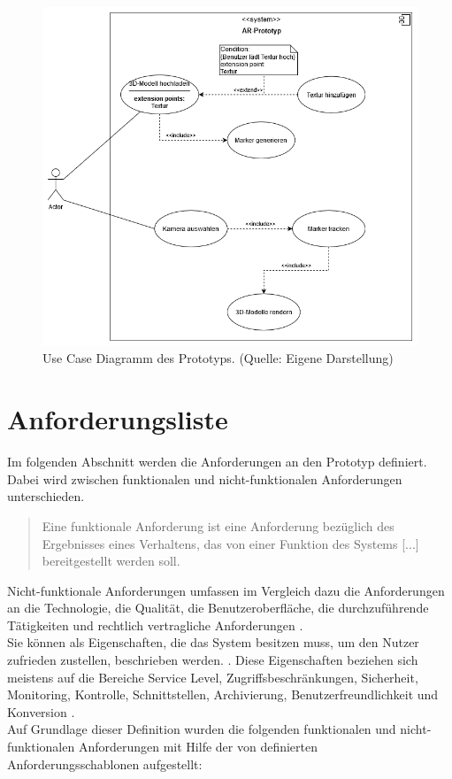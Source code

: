 \begin{figure}[h!]
\centering
\includegraphics[width=1.0\textwidth]{Abbildungen/use-case-diagram.png}
\caption[Use Cases des Prototyps]{Use Case Diagramm des Prototyps. (Quelle: Eigene Darstellung)}
\label{fig:Use-Cases}
\end{figure}


\section{Anforderungsliste}
Im folgenden Abschnitt werden die Anforderungen an den Prototyp definiert. Dabei wird zwischen funktionalen und nicht-funktionalen Anforderungen unterschieden. 
\begin{quote}
\glqq Eine funktionale Anforderung ist eine Anforderung bezüglich des Ergebnisses eines Verhaltens, das von einer Funktion des Systems [...] bereitgestellt werden soll.\grqq \citep[S. 17]{rupp:requirements}
\end{quote}
Nicht-funktionale Anforderungen umfassen im Vergleich dazu die Anforderungen an die Technologie, die Qualität, die Benutzeroberfläche, die durchzuführende Tätigkeiten und rechtlich vertragliche Anforderungen \citep[S. 17]{rupp:requirements}.\\
Sie können als Eigenschaften, die das System besitzen muss, um den Nutzer zufrieden zustellen, beschrieben werden. \citep[S. 10]{robertson:requirements-process}. Diese Eigenschaften beziehen sich meistens auf die Bereiche Service Level, Zugriffsbeschränkungen, Sicherheit, Monitoring, Kontrolle, Schnittstellen, Archivierung, Benutzerfreundlichkeit und Konversion \citep[S. 139]{boehm:systementwicklung}. \\
Auf Grundlage dieser Definition wurden die folgenden funktionalen und nicht-funktionalen Anforderungen mit Hilfe der von \citeauthor[S. 219]{rupp:requirements} definierten Anforderungsschablonen aufgestellt:

